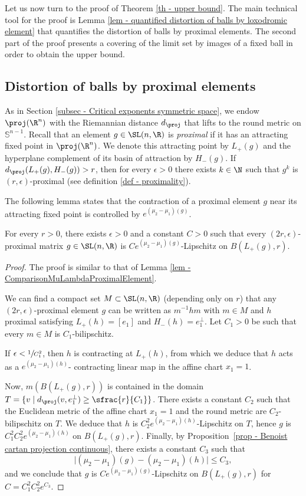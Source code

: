 Let us now turn to the proof of Theorem \ref{th - upper bound}. The main technical tool for the proof is Lemma \ref{lem - quantified distortion of balls by loxodromic element} that quantifies the distortion of balls by proximal elements. The second part of the proof presents a covering of the limit set by images of a fixed ball in order to obtain the upper bound.

\subsection{Distortion of balls by proximal elements}

As in Section \ref{subsec - Critical exponents symmetric space}, we endow $\proj(\R^n)$ with the Riemannian distance $d_\proj$ that lifts to the round metric on $\mathbb{S}^{n-1}$. Recall that an element $g\in\SL(n,\R)$ is \emph{proximal} if it has an attracting fixed point in $\proj(\R^n)$. We denote this attracting point by $L_+(g)$ and the hyperplane complement of its basin of attraction by $H_-(g)$. If $d_\proj(L_+(g), H_-(g)) > r$, then for every $\epsilon>0$ there exists $k \in \N$ such that $g^k$ is $(r,\epsilon)$-proximal (see definition \ref{def - proximality}).

The following lemma states that the contraction of a proximal element $g$ near its attracting fixed point is controlled by $e^{(\mu_2-\mu_1)(g)}$.

\begin{lemma}\label{lem - quantified distortion of balls by loxodromic element}
For every $r>0$, there exists $\epsilon >0$ and a constant $C>0$ such that every $(2r,\epsilon)$-proximal matrix $g\in \SL(n,\R)$ is $Ce^{(\mu_2-\mu_1)(g)}$-Lipschitz on $B(L_+(g),r)$.
\end{lemma}

\begin{proof}
The proof is similar to that of Lemma \ref{lem - ComparisonMuLambdaProximalElement}.

We can find a compact set $M \subset \SL(n,\R)$ (depending only on $r$) that any $(2r,\epsilon)$-proximal element $g$ can be written as $m^{-1}hm$ with $m\in M$ and $h$ proximal satisfying $L_+(h) = [e_1]$ and $H_-(h) = e_1^\perp$. Let $C_1>0$ be such that every $m\in M$ is $C_1$-bilipschitz.

If $\epsilon < \sfrac{1}{C_1^2}$, then $h$ is contracting at $L_+(h)$, from which we deduce that $h$ acts as a $e^{(\mu_2-\mu_1)(h)}$- contracting linear map in the affine chart $x_1=1$.

Now, $m(B(L_+(g),r))$ is contained in the domain $T = \{v \mid d_\proj(v, e_1^\perp) \geq \sfrac{r}{C_1}\}$. There exists a constant $C_2$ such that the Euclidean metric of the affine chart $x_1=1$ and the round metric are $C_2$-bilipschitz on $T$. We deduce that $h$ is $C_2^2e^{(\mu_2-\mu_1)(h)}$-Lipschitz on $T$, hence $g$ is $C_1^2 C_2^2e^{(\mu_2-\mu_1)(h)}$ on $B(L_+(g),r)$. Finally, by Proposition~\ref{prop - Benoist cartan projection continuous}, there exists a constant $C_3$ such that
\[\vert(\mu_2-\mu_1)(g)- (\mu_2-\mu_1)(h)\vert \leq C_3 ,\] and we conclude that $g$ is $Ce^{(\mu_2-\mu_1)(g)}$-Lipschitz on $B(L_+(g),r)$ for $C=C_1^2 C_2^2e^{C_3}$.
\end{proof}

